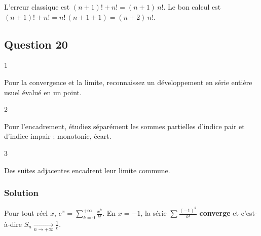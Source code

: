 \documentclass[11pt,a4paper]{article}
\newcommand{\equationajustee}[1]{%
  \sbox{\boiteequation}{$\displaystyle #1$}%
  \ifdim\wd\boiteequation>\linewidth
    \[\resizebox{\linewidth}{!}{\usebox{\boiteequation}}\]%
  \else
    \[#1\]%
  \fi}
\begin{document}
\begin{piege}

L'erreur classique est \((n+1)!+n!=(n+1)\,n!\). Le bon calcul est \((n+1)!+n!=n!\,(n+1+1)=(n+2)\,n!\).

\end{piege}

\hypertarget{question-20}{%
\subsection{Question 20}\label{question-20}}

\begin{indication}{1}

Pour la convergence et la limite, reconnaissez un développement en série entière usuel évalué en un point.

\end{indication}

\begin{indication}{2}

Pour l'encadrement, étudiez séparément les sommes partielles d'indice pair et d'indice impair : monotonie, écart.

\end{indication}

\begin{indication}{3}

Des suites adjacentes encadrent leur limite commune.

\end{indication}

\hypertarget{solution-19}{%
\subsubsection{Solution}\label{solution-19}}

Pour tout réel \(x\), \(e^x=\sum_{k=0}^{+\infty}\frac{x^k}{k!}\). En \(x=-1\), la série \(\sum\frac{(-1)^k}{k!}\) \textbf{converge} et
\equationajustee{\boxed{\sum_{k=0}^{+\infty}\frac{(-1)^k}{k!}=\frac1e},}
c'est-à-dire \(S_n\xrightarrow[n\to+\infty]{}\frac1e\).
\end{document}
